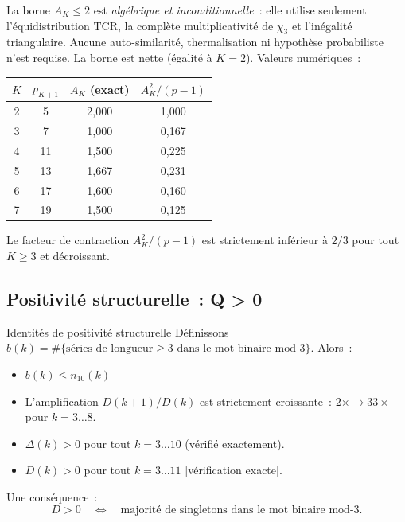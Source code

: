 \documentclass[12pt,a4paper]{article}
\begin{document}
\begin{remarque}
La borne $A_K \leq 2$ est \emph{algébrique et inconditionnelle}~:
elle utilise seulement l'équidistribution TCR, la complète
multiplicativité de $\chi_3$ et l'inégalité triangulaire. Aucune
auto-similarité, thermalisation ni hypothèse probabiliste n'est
requise. La borne est nette (égalité à $K=2$). Valeurs numériques~:
\begin{center}
\begin{tabular}{cccc}
\toprule
$K$ & $p_{K+1}$ & $A_K$ (exact) & $A_K^2/(p-1)$ \\
\midrule
2 & 5 & 2{,}000 & 1{,}000 \\
3 & 7 & 1{,}000 & 0{,}167 \\
4 & 11 & 1{,}500 & 0{,}225 \\
5 & 13 & 1{,}667 & 0{,}231 \\
6 & 17 & 1{,}600 & 0{,}160 \\
7 & 19 & 1{,}500 & 0{,}125 \\
\bottomrule
\end{tabular}
\end{center}
Le facteur de contraction $A_K^2/(p-1)$ est strictement inférieur à
$2/3$ pour tout $K \geq 3$ et décroissant.
\end{remarque}

\subsection{Positivité structurelle~: Q > 0}
\label{sec:ch7_positivity}

\begin{thmbox}{Identités de positivité structurelle}
\label{thm:positivity}
Définissons $b(k) = \#\{\text{séries de longueur} \geq 3 \text{ dans
le mot binaire mod-3}\}$. Alors~:
\begin{itemize}[nosep]
\item $b(k) \leq n_{10}(k)$ 
\item L'amplification $D(k+1)/D(k)$ est strictement croissante~:
  $2\times \to 33\times$ pour $k = 3\ldots 8$.
\item $\Delta(k) > 0$ pour tout $k = 3\ldots 10$ (vérifié exactement).
\item $D(k) > 0$ pour tout $k = 3\ldots 11$ [vérification exacte].
\end{itemize}
Une conséquence~:
\begin{equation}
  D > 0 \quad\Longleftrightarrow\quad
  \text{majorité de singletons dans le mot binaire mod-3.}
  \label{eq:D_pos_criterion}
\end{equation}
\end{thmbox}
\end{document}
